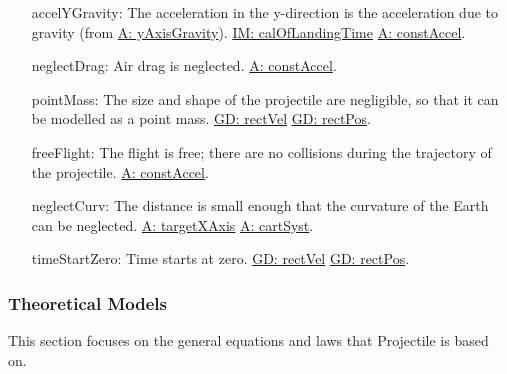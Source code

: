 \documentclass[12pt]{article}
\begin{document}
\begin{itemize}
\item[accelYGravity:\phantomsection\label{accelYGravity}]The acceleration in the y-direction is the acceleration due to gravity (from \hyperref[yAxisGravity]{A: yAxisGravity}). \hyperref[IM:calOfLandingTime]{IM: calOfLandingTime} \hyperref[constAccel]{A: constAccel}.
\item[neglectDrag:\phantomsection\label{neglectDrag}]Air drag is neglected. \hyperref[constAccel]{A: constAccel}.
\item[pointMass:\phantomsection\label{pointMass}]The size and shape of the projectile are negligible, so that it can be modelled as a point mass. \hyperref[GD:rectVel]{GD: rectVel} \hyperref[GD:rectPos]{GD: rectPos}.
\item[freeFlight:\phantomsection\label{freeFlight}]The flight is free; there are no collisions during the trajectory of the projectile. \hyperref[constAccel]{A: constAccel}.
\item[neglectCurv:\phantomsection\label{neglectCurv}]The distance is small enough that the curvature of the Earth can be neglected. \hyperref[targetXAxis]{A: targetXAxis} \hyperref[cartSyst]{A: cartSyst}.
\item[timeStartZero:\phantomsection\label{timeStartZero}]Time starts at zero. \hyperref[GD:rectVel]{GD: rectVel} \hyperref[GD:rectPos]{GD: rectPos}.
\end{itemize}
\subsubsection{Theoretical Models}
\label{Sec:TMs}
This section focuses on the general equations and laws that Projectile is based on.
\par~
\end{document}

